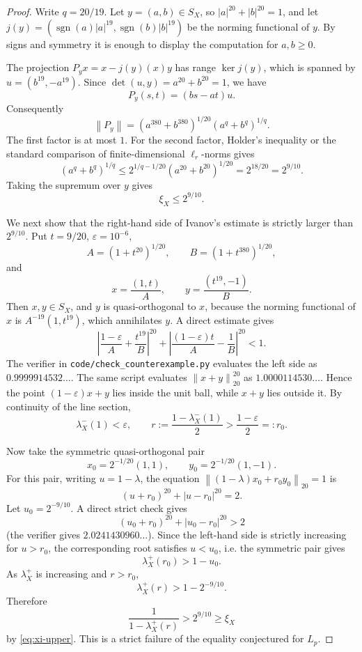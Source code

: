 \documentclass[11pt]{article}
\newcommand{\norm}[1]{\left\|#1\right\|}
\begin{document}
\begin{proof}
Write \(q=20/19\). Let \(y=(a,b)\in S_X\), so
\(|a|^{20}+|b|^{20}=1\), and let \(j(y)=(\operatorname{sgn}(a)|a|^{19},
\operatorname{sgn}(b)|b|^{19})\) be the norming functional of \(y\).
By signs and symmetry it is enough to display the computation for
\(a,b\geq0\).

The projection \(P_yx=x-j(y)(x)y\) has range \(\ker j(y)\), which is spanned
by \(u=(b^{19},-a^{19})\). Since
\(\det(u,y)=a^{20}+b^{20}=1\), we have
\[
P_y(s,t)=(bs-at)u .
\]
Consequently
\[
\norm{P_y}
=\left(a^{380}+b^{380}\right)^{1/20}
 \left(a^{q}+b^{q}\right)^{1/q}.
\]
The first factor is at most \(1\). For the second factor, Holder's inequality
or the standard comparison of finite-dimensional \(\ell_r\)-norms gives
\[
\left(a^q+b^q\right)^{1/q}\leq
2^{1/q-1/20}\left(a^{20}+b^{20}\right)^{1/20}
=2^{18/20}=2^{9/10}.
\]
Taking the supremum over \(y\) gives
\begin{equation}\label{eq:xi-upper}
\xi_X\leq 2^{9/10}.
\end{equation}

We next show that the right-hand side of Ivanov's estimate is strictly larger
than \(2^{9/10}\). Put \(t=9/20\), \(\varepsilon=10^{-6}\),
\[
A=(1+t^{20})^{1/20},\qquad
B=(1+t^{380})^{1/20},
\]
and
\[
x=\frac{(1,t)}{A},\qquad y=\frac{(t^{19},-1)}{B}.
\]
Then \(x,y\in S_X\), and \(y\) is quasi-orthogonal to \(x\), because the
norming functional of \(x\) is \(A^{-19}(1,t^{19})\), which annihilates \(y\).
A direct estimate gives
\[
\left|
\frac{1-\varepsilon}{A}+\frac{t^{19}}{B}
\right|^{20}
+
\left|
\frac{(1-\varepsilon)t}{A}-\frac{1}{B}
\right|^{20}
<1 .
\]
The verifier in \texttt{code/check\_counterexample.py} evaluates the left
side as \(0.9999914532\ldots\). The same script evaluates
\(\norm{x+y}_{20}^{20}\) as \(1.0000114530\ldots\). Hence the point
\((1-\varepsilon)x+y\) lies inside the unit ball, while \(x+y\) lies outside
it. By continuity of the line section,
\[
\lambda_X^-(1)<\varepsilon,
\qquad
r:=\frac{1-\lambda_X^-(1)}2>\frac{1-\varepsilon}{2}=:r_0.
\]

Now take the symmetric quasi-orthogonal pair
\[
x_0=2^{-1/20}(1,1),\qquad y_0=2^{-1/20}(1,-1).
\]
For this pair, writing \(u=1-\lambda\), the equation
\(\norm{(1-\lambda)x_0+r_0y_0}_{20}=1\) is
\[
(u+r_0)^{20}+|u-r_0|^{20}=2.
\]
Let \(u_0=2^{-9/10}\). A direct strict check gives
\[
(u_0+r_0)^{20}+|u_0-r_0|^{20}>2
\]
(the verifier gives \(2.0241430960\ldots\)). Since the left-hand side is
strictly increasing for \(u>r_0\), the corresponding root satisfies
\(u<u_0\), i.e. the symmetric pair gives
\[
\lambda_X^+(r_0)>1-u_0.
\]
As \(\lambda_X^+\) is increasing and \(r>r_0\),
\[
\lambda_X^+(r)>1-2^{-9/10}.
\]
Therefore
\[
\frac{1}{1-\lambda_X^+(r)}>2^{9/10}\geq \xi_X
\]
by \eqref{eq:xi-upper}. This is a strict failure of the equality conjectured
for \(L_p\).
\end{proof}
\end{document}
